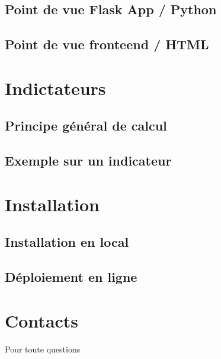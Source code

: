 \documentclass[letterpaper,10pt,french]{sphinxmanual}
\begin{document}
\subsection{Point de vue Flask App / Python}
\label{\detokenize{infrastructure:point-de-vue-flask-app-python}}

\subsection{Point de vue fronte\sphinxhyphen{}end / HTML}
\label{\detokenize{infrastructure:point-de-vue-fronte-end-html}}

\section{Indictateurs}
\label{\detokenize{indicateurs:indictateurs}}\label{\detokenize{indicateurs::doc}}

\subsection{Principe général de calcul}
\label{\detokenize{indicateurs:principe-general-de-calcul}}

\subsection{Exemple sur un indicateur}
\label{\detokenize{indicateurs:exemple-sur-un-indicateur}}

\section{Installation}
\label{\detokenize{use:installation}}\label{\detokenize{use::doc}}

\subsection{Installation en local}
\label{\detokenize{use:installation-en-local}}

\subsection{Déploiement en ligne}
\label{\detokenize{use:deploiement-en-ligne}}

\section{Contacts}
\label{\detokenize{contacts:contacts}}\label{\detokenize{contacts::doc}}
\sphinxAtStartPar
Pour toute questions
\end{document}
